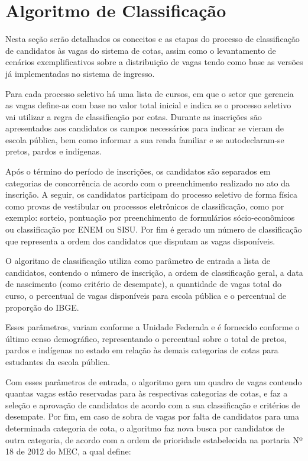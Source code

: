 \section{Algoritmo de Classificação}
\label{algoritimodeclassificacao}

Nesta seção serão detalhados os conceitos e as etapas do processo de classificação de candidatos às vagas do sistema de cotas, assim como o levantamento de cenários exemplificativos sobre a distribuição de vagas tendo como base as versões já implementadas no sistema de ingresso.

Para cada processo seletivo há uma lista de cursos, em que o setor que gerencia as vagas define-as com base no valor total inicial e indica se o processo seletivo vai utilizar a regra de classificação por cotas. Durante as inscrições são apresentados aos candidatos os campos necessários para indicar se vieram de escola pública, bem como informar a sua renda familiar e se autodeclaram-se pretos, pardos e indígenas.

Após o término do período de inscrições, os candidatos são separados em categorias de concorrência de acordo com o preenchimento realizado no ato da inscrição. A seguir, os candidatos participam do processo seletivo de forma física como provas de vestibular ou processos eletrônicos de classificação, como por exemplo: sorteio, pontuação por preenchimento de formulários sócio-econômicos ou classificação por \gls{ENEM} ou \gls{SISU}. Por fim é gerado um número de classificação que representa a ordem dos candidatos que disputam as vagas disponíveis.

O algoritmo de classificação utiliza como parâmetro de entrada a lista de candidatos, contendo o número de inscrição, a ordem de classificação geral, a data de nascimento (como critério de desempate), a quantidade de vagas total do curso, o percentual de vagas disponíveis para escola pública e o percentual de proporção do \gls{IBGE}.

Esses parâmetros, variam conforme a Unidade Federada e é fornecido conforme o último censo demográfico, representando o percentual sobre o total de pretos, pardos e indígenas no estado em relação às demais categorias de cotas para estudantes da escola pública.

Com esses parâmetros de entrada, o algoritmo gera um quadro de vagas contendo quantas vagas estão reservadas para às respectivas categorias de cotas, e faz a seleção e aprovação de candidatos de acordo com a sua classificação e critérios de desempate. Por fim, em caso de sobra de vagas por falta de candidatos para uma determinada categoria de cota, o algoritmo faz nova busca por candidatos de outra categoria, de acordo com a ordem de prioridade estabelecida na portaria Nº 18 de 2012 do \gls{MEC}, a qual define:

